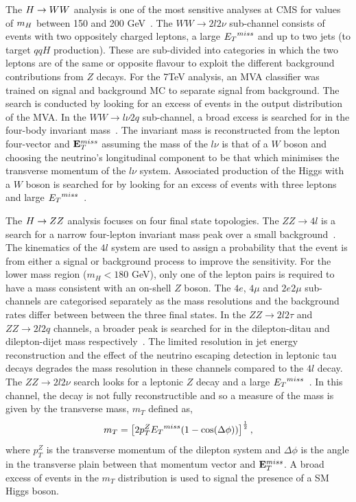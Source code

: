 The $H\rightarrow WW$ analysis is one of the most sensitive analyses at CMS for
values of $m_{H}$ between 150 and 200 GeV~\citep{HIG-12-017}. 
The $WW\rightarrow2l2\nu$ sub-channel consists of events with 
two oppositely charged leptons, a large ${E_{T}}^{miss}$ and up 
to two jets (to target $qqH$ production).
These are sub-divided into categories in which the two leptons
are of the same or opposite flavour to exploit the different
background contributions from $Z$ decays. For the 7TeV analysis,
an MVA classifier was trained on signal and background 
MC to separate signal from background. The search is conducted by looking 
for an excess of events in the output distribution of the MVA.
In the $WW\rightarrow l\nu 2q$ sub-channel, a broad excess is searched
for in the four-body invariant mass~\citep{HIG-12-021}. 
The invariant mass is reconstructed from the lepton four-vector and ${\mathbf{E}^{miss}_{T}}$ 
assuming the mass of the $l\nu$ is that of a $W$ boson and 
choosing the neutrino's longitudinal component to be that which minimises 
the transverse momentum of the $l\nu$ system.
Associated production of the Higgs with a $W$ boson is searched for 
by looking for an excess of events with three leptons and large 
${E_{T}}^{miss}$~\citep{HIG-11-034}.

The $H\rightarrow ZZ$ analysis focuses on four final state topologies.
The $ZZ\rightarrow 4l$ is a search for a narrow four-lepton invariant mass 
peak over a small background~\citep{HIG-12-016}. The kinematics of the $4l$ system are used
to assign a probability that the event is from either a signal or background 
process to improve the sensitivity. For the lower mass region ($m_{H}<180$ GeV),
only one of the lepton pairs is required to have a mass consistent with an 
on-shell $Z$ boson.
The $4e$, $4\mu$ and $2e2\mu$ sub-channels are categorised separately as the 
mass resolutions and the background rates differ between between the three 
final states. In the $ZZ\rightarrow 2l2\tau$ and $ZZ\rightarrow 2l2q$ channels, 
a broader peak is searched for in the dilepton-ditau and dilepton-dijet
mass respectively~\citep{HIG-12-016,HIG-11-027}. 
The limited resolution in jet energy reconstruction
and the effect of the neutrino escaping detection in leptonic tau decays
degrades the mass resolution in these channels compared to the $4l$ decay.
The $ZZ\rightarrow 2l2\nu$ search looks for a leptonic $Z$ decay
and a large ${E_{T}}^{miss}$~\citep{HIG-12-023}.
In this channel, the decay is not fully reconstructible and so a measure of the mass
is given by the transverse mass, $m_{T}$ defined as,
\begin{equation}
m_{T} = \left[2 p_{T}^{Z}{E_{T}}^{miss}(1-\cos(\Delta\phi))\right]^{\frac{1}{2}},
\end{equation}
where $p_{T}^{Z}$ is the transverse momentum of the dilepton system and 
$\Delta\phi$ is the angle in the transverse plain between that momentum vector and 
${\mathbf{E}^{miss}_{T}}$.
A broad excess of events in the $m_{T}$ distribution is used to signal the presence 
of a SM Higgs boson.


